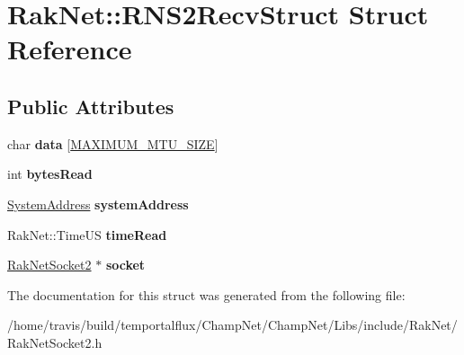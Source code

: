 \hypertarget{struct_rak_net_1_1_r_n_s2_recv_struct}{\section{Rak\-Net\-:\-:R\-N\-S2\-Recv\-Struct Struct Reference}
\label{struct_rak_net_1_1_r_n_s2_recv_struct}
}
\subsection*{Public Attributes}
\begin{DoxyCompactItemize}
\item 
\hypertarget{struct_rak_net_1_1_r_n_s2_recv_struct_a064a2ee7ff2269eedb8aa090f4c6d560}{char {\bfseries data} \mbox{[}\hyperlink{_m_t_u_size_8h_a39d9da73f39bf9acabfc9e0ad2ae97c5}{M\-A\-X\-I\-M\-U\-M\-\_\-\-M\-T\-U\-\_\-\-S\-I\-Z\-E}\mbox{]}}\label{struct_rak_net_1_1_r_n_s2_recv_struct_a064a2ee7ff2269eedb8aa090f4c6d560}

\item 
\hypertarget{struct_rak_net_1_1_r_n_s2_recv_struct_a5e48ad633e51d4eb20879f5e37b0180b}{int {\bfseries bytes\-Read}}\label{struct_rak_net_1_1_r_n_s2_recv_struct_a5e48ad633e51d4eb20879f5e37b0180b}

\item 
\hypertarget{struct_rak_net_1_1_r_n_s2_recv_struct_acf19f0d21d25324ef46bb8716210bb46}{\hyperlink{struct_rak_net_1_1_system_address}{System\-Address} {\bfseries system\-Address}}\label{struct_rak_net_1_1_r_n_s2_recv_struct_acf19f0d21d25324ef46bb8716210bb46}

\item 
\hypertarget{struct_rak_net_1_1_r_n_s2_recv_struct_a55347d16165e1a884c263bb3bfd887ae}{Rak\-Net\-::\-Time\-U\-S {\bfseries time\-Read}}\label{struct_rak_net_1_1_r_n_s2_recv_struct_a55347d16165e1a884c263bb3bfd887ae}

\item 
\hypertarget{struct_rak_net_1_1_r_n_s2_recv_struct_a13304ba5f1b50f29a63e6ca4dffd083e}{\hyperlink{class_rak_net_1_1_rak_net_socket2}{Rak\-Net\-Socket2} $\ast$ {\bfseries socket}}\label{struct_rak_net_1_1_r_n_s2_recv_struct_a13304ba5f1b50f29a63e6ca4dffd083e}

\end{DoxyCompactItemize}


The documentation for this struct was generated from the following file\-:\begin{DoxyCompactItemize}
\item 
/home/travis/build/temportalflux/\-Champ\-Net/\-Champ\-Net/\-Libs/include/\-Rak\-Net/Rak\-Net\-Socket2.\-h\end{DoxyCompactItemize}
